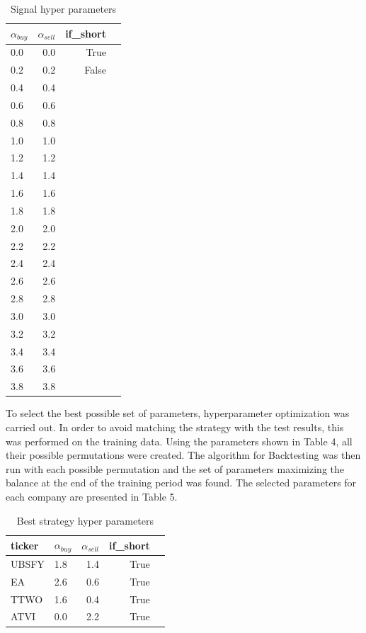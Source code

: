 \documentclass[11pt]{article} %
\begin{document}
\begin{table}[H]
\centering
\caption{Signal hyper parameters}
\begin{tabular}{lrrl}
\toprule
  $\alpha_{buy}$ &  $\alpha_{sell}$  & if\_short \\
\midrule
        0.0 &           0.0 &     True \\
         0.2 &           0.2 &    False \\
         0.4 &           0.4  \\
         0.6 &           0.6  \\
          0.8 &           0.8  \\
          1.0 &           1.0  \\
          1.2 &           1.2  \\
          1.4 &           1.4  \\
          1.6 &           1.6  \\
          1.8 &           1.8  \\
         2.0 &           2.0  \\
          2.2 &           2.2  \\
          2.4 &           2.4  \\
          2.6 &           2.6  \\
          2.8 &           2.8  \\
          3.0 &           3.0  \\
          3.2 &           3.2  \\
          3.4 &           3.4  \\
          3.6 &           3.6  \\
          3.8 &           3.8  \\
\bottomrule
\end{tabular}
\end{table}

To select the best possible set of parameters, hyperparameter optimization was carried out. In order to avoid matching the strategy with the test results, this was performed on the training data. Using the parameters shown in Table 4, all their possible permutations were created. The algorithm for Backtesting was then run with each possible permutation and the set of parameters maximizing the balance at the end of the training period was found. The selected parameters for each company are presented in Table 5. 

\begin{table}[H]
\centering
\caption{Best strategy hyper parameters}
\begin{tabular}{llrrl}
\toprule
 ticker &  $\alpha_{buy}$ &  $\alpha_{sell}$  &  if\_short \\
\midrule
  UBSFY &          1.8 &           1.4 &      True \\
     EA &          2.6 &           0.6 &      True \\
   TTWO &          1.6 &           0.4 &      True \\
   ATVI &          0.0 &           2.2 &      True \\
\bottomrule
\end{tabular}
\end{table}
\end{document}
